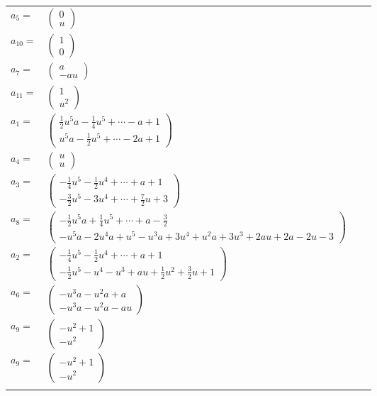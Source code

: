\documentclass[1p]{elsarticle_modified}
\theoremstyle{definition}
\begin{document}
\begin{tabular}{m{7pt} m{180pt} m{7pt} m{180pt} }
\flushright $a_{5}=$&$\begin{pmatrix}0\\u\end{pmatrix}$ \\
\flushright $a_{10}=$&$\begin{pmatrix}1\\0\end{pmatrix}$ \\
\flushright $a_{7}=$&$\begin{pmatrix}a\\- a u\end{pmatrix}$ \\
\flushright $a_{11}=$&$\begin{pmatrix}1\\u^2\end{pmatrix}$ \\
\flushright $a_{1}=$&$\begin{pmatrix}\frac{1}{2} u^5 a-\frac{1}{4} u^5+\cdots- a+1\\u^5 a-\frac{1}{2} u^5+\cdots-2 a+1\end{pmatrix}$ \\
\flushright $a_{4}=$&$\begin{pmatrix}u\\u\end{pmatrix}$ \\
\flushright $a_{3}=$&$\begin{pmatrix}-\frac{1}{4} u^5-\frac{1}{2} u^4+\cdots+a+1\\-\frac{3}{2} u^5-3 u^4+\cdots+\frac{7}{2} u+3\end{pmatrix}$ \\
\flushright $a_{8}=$&$\begin{pmatrix}-\frac{1}{2} u^5 a+\frac{1}{4} u^5+\cdots+a-\frac{3}{2}\\- u^5 a-2 u^4 a+u^5- u^3 a+3 u^4+u^2 a+3 u^3+2 a u+2 a-2 u-3\end{pmatrix}$ \\
\flushright $a_{2}=$&$\begin{pmatrix}-\frac{1}{4} u^5-\frac{1}{2} u^4+\cdots+a+1\\-\frac{1}{2} u^5- u^4- u^3+a u+\frac{1}{2} u^2+\frac{3}{2} u+1\end{pmatrix}$ \\
\flushright $a_{6}=$&$\begin{pmatrix}- u^3 a- u^2 a+a\\- u^3 a- u^2 a- a u\end{pmatrix}$ \\
\flushright $a_{9}=$&$\begin{pmatrix}- u^2+1\\- u^2\end{pmatrix}$\\ \flushright $a_{9}=$&$\begin{pmatrix}- u^2+1\\- u^2\end{pmatrix}$\\&\end{tabular}
\end{document}
